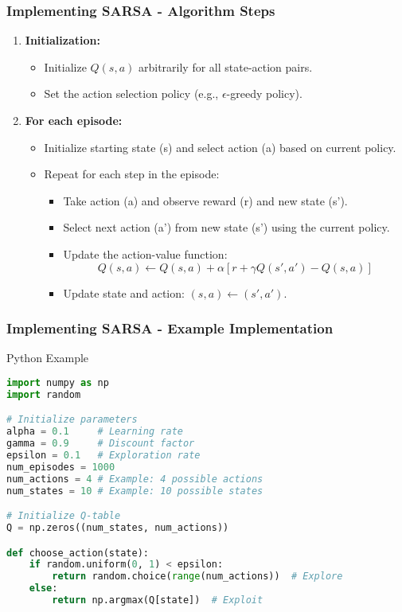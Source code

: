 \documentclass[aspectratio=169]{beamer}
\begin{document}
\begin{frame}[fragile]
    \frametitle{Implementing SARSA - Algorithm Steps}
    \begin{enumerate}
        \item \textbf{Initialization:}
            \begin{itemize}
                \item Initialize $Q(s, a)$ arbitrarily for all state-action pairs.
                \item Set the action selection policy (e.g., $\epsilon$-greedy policy).
            \end{itemize}
        \item \textbf{For each episode:} 
            \begin{itemize}
                \item Initialize starting state (s) and select action (a) based on current policy.
                \item Repeat for each step in the episode:
                    \begin{itemize}
                        \item Take action (a) and observe reward (r) and new state (s').
                        \item Select next action (a') from new state (s') using the current policy.
                        \item Update the action-value function:
                        \begin{equation}
                        Q(s, a) \leftarrow Q(s, a) + \alpha \left[ r + \gamma Q(s', a') - Q(s, a) \right]
                        \end{equation}
                        \item Update state and action: $(s, a) \leftarrow (s', a')$.
                    \end{itemize}
            \end{itemize}
    \end{enumerate}
\end{frame}

\begin{frame}[fragile]
    \frametitle{Implementing SARSA - Example Implementation}
    \begin{block}{Python Example}
        \begin{lstlisting}[language=Python]
import numpy as np
import random

# Initialize parameters
alpha = 0.1     # Learning rate
gamma = 0.9     # Discount factor
epsilon = 0.1   # Exploration rate
num_episodes = 1000
num_actions = 4 # Example: 4 possible actions
num_states = 10 # Example: 10 possible states

# Initialize Q-table
Q = np.zeros((num_states, num_actions))

def choose_action(state):
    if random.uniform(0, 1) < epsilon:
        return random.choice(range(num_actions))  # Explore
    else:
        return np.argmax(Q[state])  # Exploit
\end{lstlisting}
    \end{block}
\end{frame}
\end{document}
